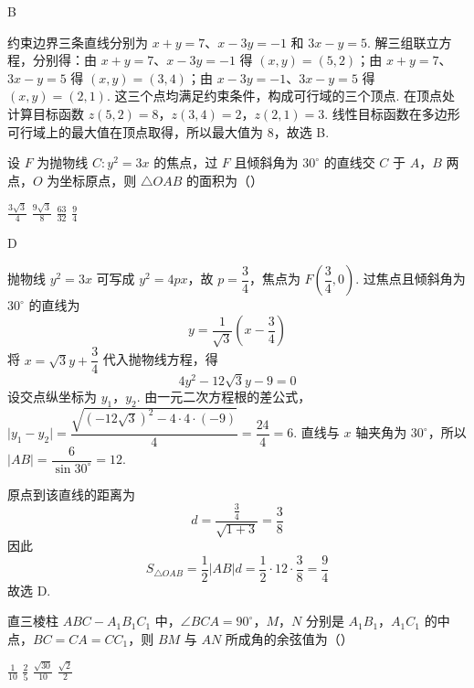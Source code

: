 \begin{answer}
B
\end{answer}

\begin{solution}
约束边界三条直线分别为 \(x+y=7\)、\(x-3y=-1\) 和 \(3x-y=5\). 解三组联立方程，分别得：由 \(x+y=7\)、\(x-3y=-1\) 得 \((x,y)=(5,2)\)；由 \(x+y=7\)、\(3x-y=5\) 得 \((x,y)=(3,4)\)；由 \(x-3y=-1\)、\(3x-y=5\) 得 \((x,y)=(2,1)\).
这三个点均满足约束条件，构成可行域的三个顶点. 在顶点处计算目标函数
\(z(5,2)=8\)，\(z(3,4)=2\)，\(z(2,1)=3\).
线性目标函数在多边形可行域上的最大值在顶点取得，所以最大值为 \(8\)，故选 B.
\end{solution}

\begin{problem}
设 \(F\) 为抛物线 \(C:y^2=3x\) 的焦点，过 \(F\) 且倾斜角为 \(30^{\circ}\) 的直线交 \(C\) 于 \(A\)，\(B\) 两点，\(O\) 为坐标原点，则 \(\triangle OAB\) 的面积为（\quad）

\choices
    {\(\frac{3\sqrt{3}}{4}\)}
    {\(\frac{9\sqrt{3}}{8}\)}
    {\(\frac{63}{32}\)}
    {\(\frac{9}{4}\)}
\end{problem}

\begin{answer}
D
\end{answer}

\begin{solution}
抛物线 \(y^2=3x\) 可写成 \(y^2=4px\)，故 \(p=\dfrac{3}{4}\)，焦点为 \(F\left(\dfrac{3}{4},0\right)\). 过焦点且倾斜角为 \(30^{\circ}\) 的直线为
\[
y=\frac{1}{\sqrt{3}}\left(x-\frac{3}{4}\right)
\]
将 \(x=\sqrt{3}y+\dfrac{3}{4}\) 代入抛物线方程，得
\[
4y^2-12\sqrt{3}y-9=0
\]
设交点纵坐标为 \(y_1\)，\(y_2\). 由一元二次方程根的差公式，
\(\lvert y_1-y_2\rvert=\dfrac{\sqrt{(-12\sqrt{3})^2-4\cdot4\cdot(-9)}}{4}=\dfrac{24}{4}=6\). 直线与 \(x\) 轴夹角为 \(30^{\circ}\)，所以 \(|AB|=\dfrac{6}{\sin30^{\circ}}=12\).

原点到该直线的距离为
\[
d=\frac{\frac{3}{4}}{\sqrt{1+3}}=\frac{3}{8}
\]
因此
\[
S_{\triangle OAB}=\frac{1}{2}|AB|d=\frac{1}{2}\cdot12\cdot\frac{3}{8}=\frac{9}{4}
\]
故选 D.
\end{solution}

\begin{problem}
直三棱柱 \(ABC-A_1B_1C_1\) 中，\(\angle BCA=90^{\circ}\)，\(M\)，\(N\) 分别是 \(A_1B_1\)，\(A_1C_1\) 的中点，\(BC=CA=CC_1\)，则 \(BM\) 与 \(AN\) 所成角的余弦值为（\quad）

\choices
    {\(\frac{1}{10}\)}
    {\(\frac{2}{5}\)}
    {\(\frac{\sqrt{30}}{10}\)}
    {\(\frac{\sqrt{2}}{2}\)}
\end{problem}

